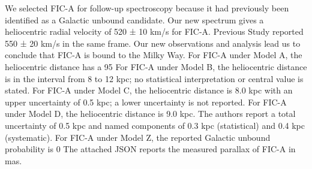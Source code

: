 We selected FIC-A for follow-up spectroscopy because it had previously been identified as a Galactic unbound candidate.
Our new spectrum gives a heliocentric radial velocity of 520 ± 10 km/s for FIC-A. Previous Study reported 550 ± 20 km/s in the same frame.
Our new observations and analysis lead us to conclude that FIC-A is bound to the Milky Way.
For FIC-A under Model A, the heliocentric distance has a 95%
For FIC-A under Model B, the heliocentric distance is in the interval from 8 to 12 kpc; no statistical interpretation or central value is stated.
For FIC-A under Model C, the heliocentric distance is 8.0 kpc with an upper uncertainty of 0.5 kpc; a lower uncertainty is not reported.
For FIC-A under Model D, the heliocentric distance is 9.0 kpc. The authors report a total uncertainty of 0.5 kpc and named components of 0.3 kpc (statistical) and 0.4 kpc (systematic).
For FIC-A under Model Z, the reported Galactic unbound probability is 0%
The attached JSON reports the measured parallax of FIC-A in mas.
